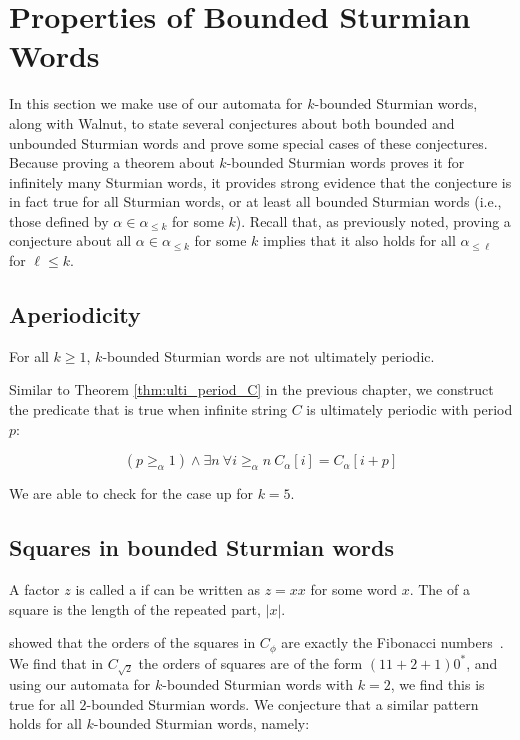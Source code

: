 \section{Properties of Bounded Sturmian Words}\label{sec:conjectures}

In this section we make use of our automata for $k$-bounded Sturmian words, along with Walnut, to state several conjectures about both bounded and unbounded Sturmian words and prove some special cases of these conjectures.
Because proving a theorem about $k$-bounded Sturmian words proves it for infinitely many Sturmian words, it provides strong evidence that the conjecture is in fact true for all Sturmian words, or at least all bounded Sturmian words (i.e., those defined by $\alpha \in \alpha_{\leq k}$ for some $k$).
Recall that, as previously noted, proving a conjecture about all $\alpha \in \alpha_{\leq k}$ for some $k$ implies that it also holds for all $\alpha_{\leq \ell}$ for $\ell \leq k$.

\subsection{Aperiodicity}

\begin{theorem}
For all $k \ge 1$, $k$-bounded Sturmian words are not ultimately periodic.
\end{theorem}

Similar to Theorem \ref{thm:ulti_period_C} in the previous chapter, we construct the predicate that is true when infinite string $C$ is ultimately periodic with period $p$:

\begin{equation*}\label{eqn:aperiodic-bounded}
    (p\ge_{\alpha} 1) \wedge \exists n~ \forall i \ge_{\alpha} n ~ C_{\alpha}[i] = C_{\alpha}[i+p]
\end{equation*}

We are able to check for the case up for $k=5$.

\subsection{Squares in bounded Sturmian words}

A factor $z$ is called a  if can be written as $z = xx$ for some word $x$.
The  of a square is the length of the repeated part, $|x|$.

\citeauthor{fibword} showed that the orders of the squares in $C_{\phi}$ are exactly the Fibonacci numbers~\cite{fibword}.
We find that in $C_{\sqrt{2}}$ the orders of squares are of the form $(11+2+1)0^*$, and using our automata for $k$-bounded Sturmian words with $k=2$, we find this is true for all $2$-bounded Sturmian words.
We conjecture that a similar pattern holds for all $k$-bounded Sturmian words, namely:

